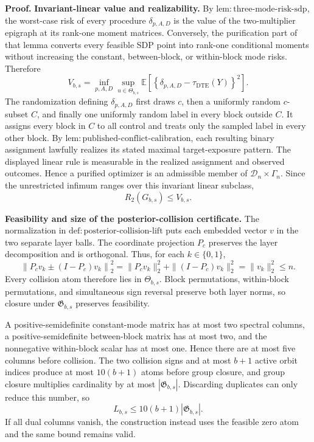 \textbf{Proof.}
\textbf{Invariant-linear value and realizability.}
By \(\mathrm{lem{:}three\text{-}mode\text{-}risk\text{-}sdp}\), the worst-case risk of every procedure \(\delta_{p,A,D}\) is the value of the two-multiplier epigraph at its rank-one moment matrices. Conversely, the purification part of that lemma converts every feasible SDP point into rank-one conditional moments without increasing the constant, between-block, or within-block mode risks. Therefore
\[
V_{b,s}
=\inf_{p,A,D}\sup_{u\in\Theta_{b,s}}
\mathbb E\!\left[\left\{\delta_{p,A,D}-\tau_{\mathrm{DTE}}(Y)\right\}^2\right].
\tag{1}
\]
The randomization defining \(\delta_{p,A,D}\) first draws \(c\), then a uniformly random \(c\)-subset \(C\), and finally one uniformly random label in every block outside \(C\). It assigns every block in \(C\) to all control and treats only the sampled label in every other block. By \(\mathrm{lem{:}published\text{-}conflict\text{-}calibration}\), each resulting binary assignment lawfully realizes its stated maximal target-exposure pattern. The displayed linear rule is measurable in the realized assignment and observed outcomes. Hence a purified optimizer is an admissible member of \(\mathcal D_n\times\Gamma_n\). Since the unrestricted infimum ranges over this invariant linear subclass,
\[
R_2(G_{b,s})\leq V_{b,s}.
\tag{2}
\]

\textbf{Feasibility and size of the posterior-collision certificate.}
The normalization in \(\mathrm{def{:}posterior\text{-}collision\text{-}lift}\) puts each embedded vector \(v\) in the two separate layer balls. The coordinate projection \(P_c\) preserves the layer decomposition and is orthogonal. Thus, for each \(k\in\{0,1\}\),
\[
\left\|P_cv_k\mathbin{\pm}(I-P_c)v_k\right\|_2^2
=\|P_cv_k\|_2^2+\|(I-P_c)v_k\|_2^2
=\|v_k\|_2^2\leq n.
\tag{3}
\]
Every collision atom therefore lies in \(\Theta_{b,s}\). Block permutations, within-block permutations, and simultaneous sign reversal preserve both layer norms, so closure under \(\mathfrak G_{b,s}\) preserves feasibility.

A positive-semidefinite constant-mode matrix has at most two spectral columns, a positive-semidefinite between-block matrix has at most two, and the nonnegative within-block scalar has at most one. Hence there are at most five columns before collision. The two collision signs and at most \(b+1\) active orbit indices produce at most \(10(b+1)\) atoms before group closure, and group closure multiplies cardinality by at most \(|\mathfrak G_{b,s}|\). Discarding duplicates can only reduce this number, so
\[
L_{b,s}\leq10(b+1)|\mathfrak G_{b,s}|.
\tag{4}
\]
If all dual columns vanish, the construction instead uses the feasible zero atom and the same bound remains valid.

